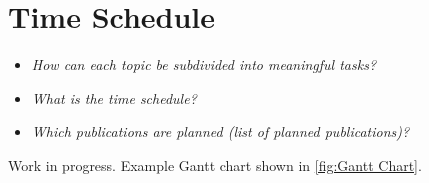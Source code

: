 \section{Time Schedule}
\label{S:time_schedule}

\begin{itemize}
   \item \emph{How can each topic be subdivided into meaningful tasks?}
	\item \emph{What is the time schedule?}
	\item \emph{Which publications are planned (list of planned publications)?}
\end{itemize}

Work in progress. Example Gantt chart shown in \cref{fig:Gantt Chart}.

